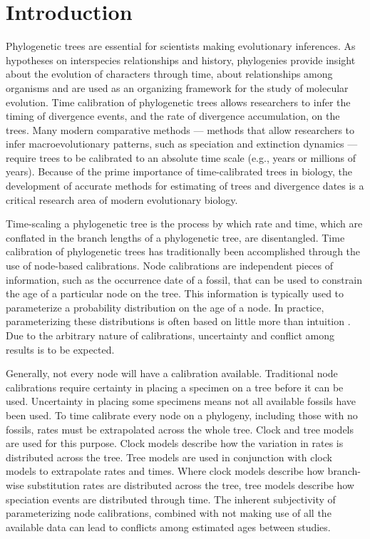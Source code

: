 \documentclass[]{article}
\begin{document}
\begin{center}
\end{center}
\section*{Introduction}
    Phylogenetic trees are essential for scientists making evolutionary inferences. As hypotheses on interspecies relationships and history, phylogenies provide insight about the evolution of characters through time, about relationships among organisms and are used as an organizing framework for the study of molecular evolution. Time calibration of phylogenetic trees allows researchers to infer the timing of divergence events, and the rate of divergence accumulation, on the trees. Many modern comparative methods --- methods that allow researchers to infer macroevolutionary patterns, such as speciation and extinction dynamics --- require trees to be calibrated to an absolute time scale (e.g., years or millions of years). Because of the prime importance of time-calibrated trees in biology, the development of accurate methods for estimating of trees and divergence dates is a critical research area of modern evolutionary biology. \par
    Time-scaling a phylogenetic tree is the process by which rate and time, which are conflated in the branch lengths of a phylogenetic tree, are disentangled. Time calibration of phylogenetic trees has traditionally been accomplished through the use of node-based calibrations. Node calibrations are independent pieces of information, such as the occurrence date of a fossil, that can be used to constrain the age of a particular node on the tree. This information is typically used to parameterize a probability distribution on the age of a node.  In practice, parameterizing these distributions is often based on little more than intuition \citep{Heath01032012, Heath22072014}. Due to the arbitrary nature of calibrations, uncertainty and conflict among results is to be expected.  \par
Generally, not every node will have a calibration available. Traditional node calibrations require certainty in placing a specimen on a tree before it can be used. Uncertainty in placing some specimens means not all available fossils have been used. To time calibrate every node on a phylogeny, including those with no fossils, rates must be extrapolated across the whole tree. Clock and tree models are used for this purpose. Clock models describe how the variation in rates is distributed across the tree. Tree models are used in conjunction with clock models to extrapolate rates and times. Where clock models describe how branch-wise substitution rates are distributed across the tree, tree models describe how speciation events are distributed through time. The inherent subjectivity of parameterizing node calibrations, combined with not making use of all the available data can lead to conflicts among estimated ages between studies. \par
\end{document}
